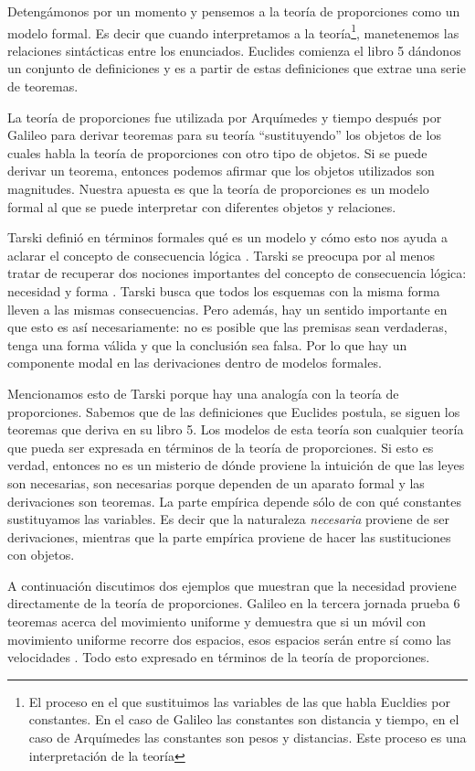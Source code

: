 Detengámonos por un momento y pensemos a la teoría de proporciones como un modelo formal. Es decir que cuando interpretamos a la teoría\footnote{El proceso en el que sustituimos las variables de las que habla Eucldies por constantes. En el caso de Galileo las constantes son distancia y tiempo, en el caso de Arquímedes las constantes son pesos y distancias. Este proceso es una interpretación de la teoría}, manetenemos las relaciones sintácticas entre los enunciados. Euclides comienza el libro 5 dándonos un conjunto de definiciones y es a partir de estas definiciones que extrae una serie de teoremas.

La teoría de proporciones fue utilizada por Arquímedes y tiempo después por Galileo para derivar teoremas para su teoría ``sustituyendo'' los objetos de los cuales habla la teoría de proporciones con otro tipo de objetos. Si se puede derivar un teorema, entonces podemos afirmar que los objetos utilizados son magnitudes. Nuestra apuesta es que la teoría de proporciones es un modelo formal al que se puede interpretar con diferentes objetos y relaciones.

Tarski definió en términos formales qué es un modelo y cómo esto nos ayuda a aclarar el concepto de consecuencia lógica \cite{Tarski1956}. Tarski se preocupa por al menos tratar de recuperar dos nociones importantes del concepto de consecuencia lógica: necesidad y forma \cite{Torrente2000}. Tarski busca que todos los esquemas con la misma forma lleven a las mismas consecuencias. Pero además, hay un sentido importante en que esto es así necesariamente: no es posible que las premisas sean verdaderas, tenga una forma válida y que la conclusión sea falsa. Por lo que hay un componente modal en las derivaciones dentro de modelos formales.

Mencionamos esto de Tarski porque hay una analogía con la teoría de proporciones. Sabemos que de las definiciones que Euclides postula, se siguen los teoremas que deriva en su libro 5. Los modelos de esta teoría son cualquier teoría que pueda ser expresada en términos de la teoría de proporciones. Si esto es verdad, entonces no es un misterio de dónde proviene la intuición de que las leyes son necesarias, son necesarias porque dependen de un aparato formal y las derivaciones son teoremas. La parte empírica depende sólo de con qué constantes sustituyamos las variables. Es decir que la naturaleza \emph{necesaria} proviene de ser derivaciones, mientras que la parte empírica proviene de hacer las sustituciones con objetos.

A continuación discutimos dos ejemplos que muestran que la necesidad proviene directamente de la teoría de proporciones. Galileo en la tercera jornada prueba 6 teoremas acerca del movimiento uniforme y demuestra que si un móvil con movimiento uniforme recorre dos espacios, esos espacios serán entre sí como las velocidades \cite[p. 215]{galtre}. Todo esto expresado en términos de la teoría de proporciones.

